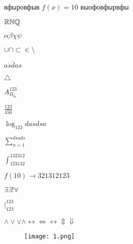 вфыровфыв $f(x) = 10$ выофовфырвфы


$\mathbb{R} \mathbb{N} \mathbb{Q}$


$\alpha \beta \chi \psi$


$\cup \cap \subset \in \setminus $


$\overline{asdas}$

$\triangle$


$ A_{B_{b_h}}^{123} $


\begin{theorem}
    

$\frac{123}{456}$

$\log_{123} dasdsa$


$\sum_{n = 1}^{dsads}$

$\int_{123132}^{132312}$

$f(10) \to 321312123$


$\exists \exists! \forall$


$|_{123}^{123}$

$\wedge \vee \lor \land \leftrightarrow \Leftrightarrow \longleftrightarrow \Updownarrow \Downarrow $


\end{theorem}


\begin{figure}[H]
    \centering
    \texttt{[image: 1.png]}
    
    
    \label{fig:1}
\end{figure}